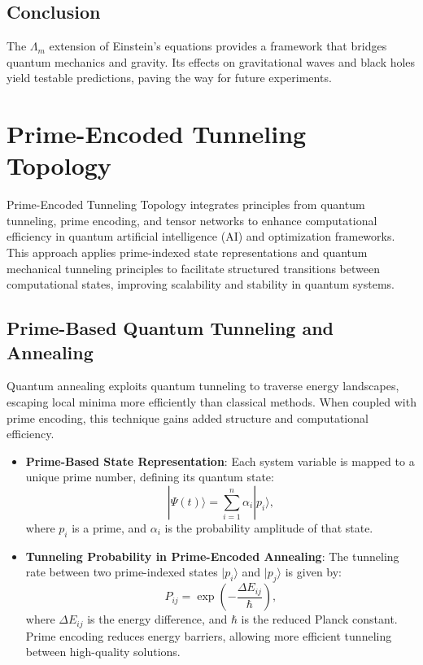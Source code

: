 \documentclass{article}
\theoremstyle{plain}
\begin{document}
\begin{itemize}
\begin{itemize}
\subsection{Conclusion}
The $\Lambda_m$ extension of Einstein’s equations provides a framework that bridges quantum mechanics and gravity. Its effects on gravitational waves and black holes yield testable predictions, paving the way for future experiments.

\section{Prime-Encoded Tunneling Topology}

Prime-Encoded Tunneling Topology integrates principles from quantum tunneling, prime encoding, and tensor networks to enhance computational efficiency in quantum artificial intelligence (AI) and optimization frameworks. This approach applies prime-indexed state representations and quantum mechanical tunneling principles to facilitate structured transitions between computational states, improving scalability and stability in quantum systems.

\subsection{Prime-Based Quantum Tunneling and Annealing}
Quantum annealing exploits quantum tunneling to traverse energy landscapes, escaping local minima more efficiently than classical methods. When coupled with prime encoding, this technique gains added structure and computational efficiency.

\begin{itemize}
    \item \textbf{Prime-Based State Representation}: Each system variable is mapped to a unique prime number, defining its quantum state:
    \begin{equation}
        |\Psi(t)\rangle = \sum_{i=1}^{n} \alpha_i |p_i\rangle,
    \end{equation}
    where $p_i$ is a prime, and $\alpha_i$ is the probability amplitude of that state.
    
    \item \textbf{Tunneling Probability in Prime-Encoded Annealing}: The tunneling rate between two prime-indexed states $|p_i\rangle$ and $|p_j\rangle$ is given by:
    \begin{equation}
        P_{ij} = \exp\left(-\frac{\Delta E_{ij}}{\hbar}\right),
    \end{equation}
    where $\Delta E_{ij}$ is the energy difference, and $\hbar$ is the reduced Planck constant.
    Prime encoding reduces energy barriers, allowing more efficient tunneling between high-quality solutions.
\end{itemize}


\end{itemize}
\end{itemize}
\end{document}
